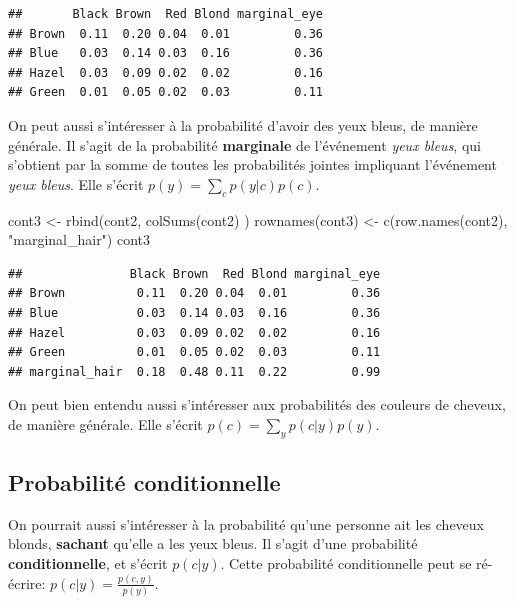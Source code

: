 \documentclass[
  a4paper,11pt,twoside,onecolumn,openright,final,oldfontcommands]{memoir}
\newenvironment{Shaded}{\begin{snugshade}}{\end{snugshade}}
\newcommand{\FunctionTok}[1]{\textcolor[rgb]{0.00,0.00,0.00}{#1}}
\newcommand{\NormalTok}[1]{#1}
\newcommand{\OtherTok}[1]{\textcolor[rgb]{0.56,0.35,0.01}{#1}}
\newcommand{\StringTok}[1]{\textcolor[rgb]{0.31,0.60,0.02}{#1}}
\theoremstyle{definition}
\theoremstyle{definition}
\theoremstyle{definition}
\theoremstyle{remark}
\begin{document}
\begin{verbatim}
##       Black Brown  Red Blond marginal_eye
## Brown  0.11  0.20 0.04  0.01         0.36
## Blue   0.03  0.14 0.03  0.16         0.36
## Hazel  0.03  0.09 0.02  0.02         0.16
## Green  0.01  0.05 0.02  0.03         0.11
\end{verbatim}

On peut aussi s'intéresser à la probabilité d'avoir des yeux bleus, de manière générale. Il s'agit de la probabilité \textbf{marginale} de l'événement \emph{yeux bleus}, qui s'obtient par la somme de toutes les probabilités jointes impliquant l'événement \emph{yeux bleus}. Elle s'écrit \(p(y)=\sum\limits_{c}p(y|c)p(c)\).

\begin{Shaded}
\begin{Highlighting}[]
\NormalTok{cont3 }\OtherTok{\textless{}{-}} \FunctionTok{rbind}\NormalTok{(cont2, }\FunctionTok{colSums}\NormalTok{(cont2) )}
\FunctionTok{rownames}\NormalTok{(cont3) }\OtherTok{\textless{}{-}} \FunctionTok{c}\NormalTok{(}\FunctionTok{row.names}\NormalTok{(cont2), }\StringTok{"marginal\_hair"}\NormalTok{)}
\NormalTok{cont3}
\end{Highlighting}
\end{Shaded}

\begin{verbatim}
##               Black Brown  Red Blond marginal_eye
## Brown          0.11  0.20 0.04  0.01         0.36
## Blue           0.03  0.14 0.03  0.16         0.36
## Hazel          0.03  0.09 0.02  0.02         0.16
## Green          0.01  0.05 0.02  0.03         0.11
## marginal_hair  0.18  0.48 0.11  0.22         0.99
\end{verbatim}

On peut bien entendu aussi s'intéresser aux probabilités des couleurs de cheveux, de manière générale. Elle s'écrit \(p(c)=\sum\limits_{y}p(c|y)p(y)\).

\hypertarget{probabilituxe9-conditionnelle}{%
\subsection{Probabilité conditionnelle}\label{probabilituxe9-conditionnelle}}

On pourrait aussi s'intéresser à la probabilité qu'une personne ait les cheveux blonds, \textbf{sachant} qu'elle a les yeux bleus. Il s'agit d'une probabilité \textbf{conditionnelle}, et s'écrit \(p(c|y)\). Cette probabilité conditionnelle peut se ré-écrire: \(p(c|y)= \frac{p(c,y)}{p(y)}\).
\end{document}

